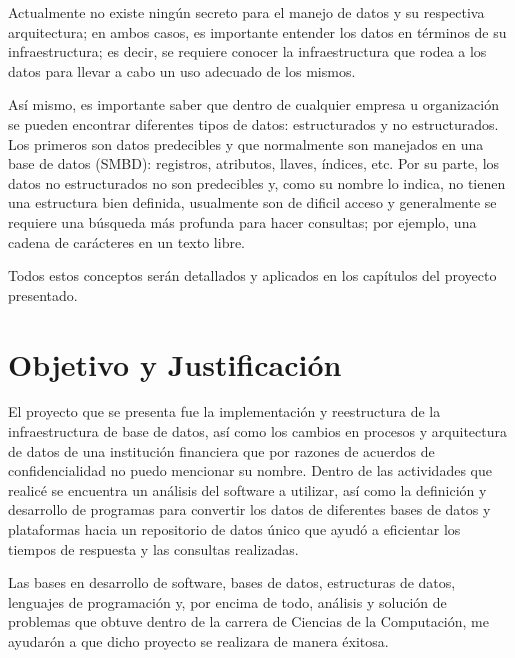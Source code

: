 \documentclass[a4paper,openright,12pt]{book}
\begin{document}
Actualmente no existe ning\'un secreto para el manejo de datos y su respectiva arquitectura; en ambos casos, es importante entender los datos en t\'erminos de su infraestructura; es decir, se requiere conocer la infraestructura que rodea a los datos para llevar a cabo un uso adecuado de los mismos.

As\'i mismo, es importante saber que dentro de cualquier empresa u organizaci\'on se pueden encontrar diferentes tipos de datos: estructurados y no estructurados. Los primeros son datos predecibles y que normalmente son manejados en una base de datos (SMBD): registros, atributos, llaves, \'indices, etc. Por su parte, los datos no estructurados no son predecibles y, como su nombre lo indica, no tienen una estructura bien definida, usualmente son de dificil acceso y generalmente se requiere una b\'usqueda m\'as profunda para hacer consultas; por ejemplo, una cadena de car\'acteres en un texto libre. 

Todos estos conceptos ser\'an detallados y aplicados en los cap\'itulos del proyecto presentado.


\chapter*{Objetivo y Justificaci\'on} \label{cap.objetivo}%

El proyecto que se presenta fue la implementaci\'on y reestructura de la infraestructura de base de datos, as\'i como los cambios en procesos y arquitectura de datos de una instituci\'on financiera que por razones de acuerdos de confidencialidad no puedo mencionar su nombre. Dentro de las actividades que realic\'e se encuentra un an\'alisis del software a utilizar, as\'i como la definici\'on y desarrollo de programas para convertir los datos de diferentes bases de datos y plataformas hacia un repositorio de datos \'unico que ayud\'o a eficientar los tiempos de respuesta y las consultas realizadas.

Las bases en desarrollo de software, bases de datos, estructuras de datos, lenguajes de programaci\'on y, por encima de todo, an\'alisis y soluci\'on de problemas que obtuve dentro de la carrera de Ciencias de la Computaci\'on, me ayudar\'on a que dicho proyecto se realizara de manera \'exitosa.  
\end{document}
